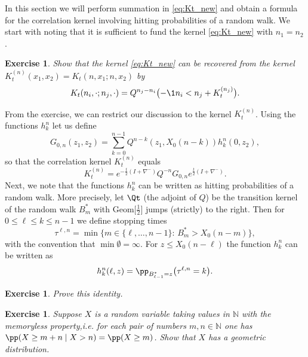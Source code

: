 \documentclass[]{pcmi}
\theoremstyle{plain}
\newtheorem{exercise}[equation]{Exercise}
\theoremstyle{definition}
\begin{document}
In this section we will perform summation in \eqref{eq:Kt_new} and obtain a formula for the correlation kernel involving hitting probabilities of a random walk. We start with noting that it is sufficient to fund the kernel \eqref{eq:Kt_new} with $n_1 = n_2$.

\begin{exercise}  Show that the kernel \eqref{eq:Kt_new} can be recovered from the kernel  $K^{(n)}_t(x_1,x_2)=K_t(n,x_1;n,x_2)$ by
\begin{equation}
K_t(n_i,\cdot;n_j,\cdot)=Q^{n_j-n_i} \bigl(-\1{n_i<n_j}+K^{(n_j)}_t\bigr).
\end{equation}
\end{exercise}

\noindent From the exercise, we can restrict our discussion to the kernel $K^{(n)}_t$. Using the functions $h^n_k$ let us define
\begin{equation}
	G_{0,n}(z_1,z_2)=\sum_{k=0}^{n-1}Q^{n-k}(z_1,X_0(n-k))h^{n}_{k}(0,z_2),
\end{equation}
so that the correlation kernel $K_t^{(n)}$ equals
\begin{equation}\label{eq:Kt-decomp}
	K_t^{(n)}=e^{-\frac{t}{2} (I+\nabla^-)} Q^{-n}G_{0,n}e^{\frac{t}{2} (I+\nabla^-)}.
\end{equation}
Next, we note that the functions $h^n_k$ can be written as hitting probabilities of a random walk. More precisely, let $\Qt$ (the adjoint of $Q$) be the transition kernel of the random walk $B_m^*$ with Geom$\bigl[\frac12\bigr]$ jumps (strictly) to the right. Then for $0\leq\ell\leq k\leq n-1$ we define stopping times
\[
\tau^{\ell,n}=\min \bigl\{m\in\{\ell,\ldots,n-1\}\!:\,B^*_m> X_0({n-m})\bigr\},
\]
with the convention that $\min\emptyset=\infty$. For $z\leq X_0(n-\ell)$ the function $h^n_k$ can be written as
\begin{equation}
h^n_k(\ell,z)=\pp_{B^*_{\ell-1}=z}\big(\tau^{\ell,n}=k\big).
\end{equation}
  
\begin{exercise} 
Prove this identity.
\end{exercise}

\begin{exercise} Suppose $X$ 
 is a random variable taking values in $\mathbb{N}$
with the \emph{memoryless property},i.e. for each pair of numbers $m,n\in\mathbb{N}$ one has
$\pp(X\ge m+n\mid X>n) = \pp(X\ge m)$.
Show that $X$ has a geometric distribution.
\end{exercise}
\end{document}
